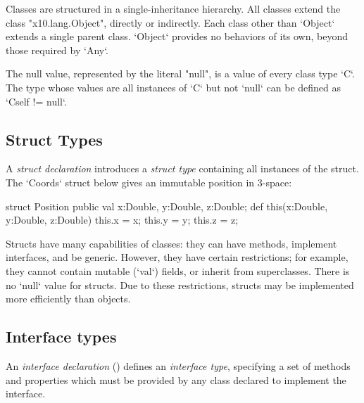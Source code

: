 
Classes are structured in a single-inheritance hierarchy. All classes extend
the class \xcd"x10.lang.Object", directly or indirectly. Each class other than
\xcd`Object` extends a single parent class.  \xcd`Object` provides no behaviors
of its own, beyond those required by \xcd`Any`.





The null value, represented by the literal
\xcd"null", is a value of every class type \xcd`C`. The type whose values are
all instances of \xcd`C` but not 
\xcd`null` can be defined as \xcd`C{self != null}`.

\subsection{Struct Types}

A {\em struct declaration}  introduces a {\em struct type}
containing all instances of the struct.  The \xcd`Coords` struct below gives
an immutable position in 3-space: 
\begin{xten}
struct Position {
  public val x:Double, y:Double, z:Double; 
  def this(x:Double, y:Double, z:Double) {
     this.x = x; this.y = y; this.z = z;
  }
}
\end{xten}
%

Structs have many capabilities of classes: they can have methods, implement
interfaces, and be generic. However, they have certain restrictions; for
example, they cannot contain mutable (\xcd`val`) fields, or inherit from
superclasses. There is no \xcd`null` value for structs. Due to these
restrictions, structs may be implemented more efficiently than objects.


\subsection{Interface types}
\label{InterfaceTypes}


An {\em interface declaration} () defines an {\em
interface type}, specifying a set of methods 
and properties which must be provided by any class declared to implement the
interface. 


